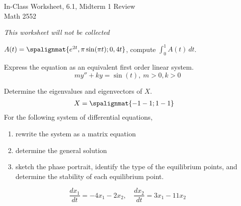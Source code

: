 \documentclass[12pt]{exam}
\newcommand{\TestName}{In-Class Worksheet, 6.1, Midterm 1 Review}
\begin{document}
    
\vspace*{-.5cm}

\newcommand{\Course}{Math 2552}

\begin{center}
{\Large \TestName 
\\[4pt]
\Course}
\end{center}

\begin{center}    
{\small
\textit{This worksheet will not be collected}
}
\end{center}

\vspace{.5cm}


\begin{questions}
    
        \question $A(t) = \spalignmat{e^{2t},  \pi \sin(\pi t) ; 0, 4t}$, compute $\displaystyle \int_0^1 A(t) \, dt$.
        
        \question Express the equation as an equivalent first order linear system. $$my'' + ky = \sin(t), \ m >0, k >0$$
    
        \question Determine the eigenvalues and eigenvectors of $X$. 
        \begin{align*}
            X & = \spalignmat{-1 -1; 1 -1 } 
        \end{align*}
        \question For the following system of differential equations, 
        \begin{enumerate}
            \item rewrite the system as a matrix equation
            \item determine the general solution
            \item sketch the phase portrait, identify the type of the equilibrium points, and determine the stability of each equilibrium point. 
        \end{enumerate}
        $$\frac{dx_1}{dt} = -4x_1 -2x_2, \quad \frac{dx_2}{dt} = 3x_1 - 11x_2 $$
            

\end{questions}
\end{document}
